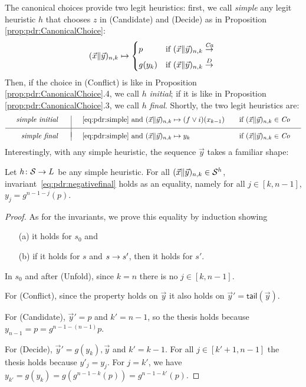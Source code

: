 The canonical choices provide two legit heuristics: first, we call \emph{simple} any legit heuristic $h$ that chooses $z$ in (Candidate) and (Decide) as in Proposition \ref{prop:pdr:CanonicalChoice}:
\begin{equation}\label{eq:pdr:simple}
	( \vec{x} \| \vec{y} )_{n,k} \mapsto
	\begin{cases*}
		p      & if $( \vec{x} \| \vec{y} )_{n,k} \tr{ \mathit{Ca} }$ \\
		g(y_k) & if $( \vec{x} \| \vec{y} )_{n,k} \tr{ D }$
	\end{cases*}
\end{equation}
Then, if the choice in (Conflict) is like in Proposition \ref{prop:pdr:CanonicalChoice}.4, we call $h$ \emph{initial}; if it is like in Proposition \ref{prop:pdr:CanonicalChoice}.3, we call $h$ \emph{final}. Shortly, the two legit heuristics are:
\[
\begin{array}{r|ll}
	\quad\emph{simple initial} \quad\
	                   & \quad\eqref{eq:pdr:simple} \text{ and }( \vec{x} \| \vec{y} )_{n,k} \mapsto
	(f\lor i)(x_{k-1}) & \quad\mbox{if $( \vec{x} \| \vec{y} )_{n,k} \in \mathit{Co}$}\quad
	\\[5pt]
	\hline
	\\[-7pt]
	\quad\emph{simple final} \quad\
	                   & \quad\eqref{eq:pdr:simple} \text{ and }
	( \vec{x} \| \vec{y} )_{n,k} \mapsto
	y_k                & \quad\mbox{if $( \vec{x} \| \vec{y} )_{n,k} \in \mathit{Co}$}\quad          \\
\end{array}
\]
Interestingly, with any simple heuristic, the sequence $\vec{y}$ takes a familiar shape:
\begin{prop}\label{prop:pdr:negativesequencefinalchain}
	Let $h\colon \mathcal{S} \to L$ be any simple heuristic. For all $( \vec{x} \| \vec{y} )_{n,k} \in \mathcal{S}^h$, invariant~\eqref{eq:pdr:negativefinal} holds as an equality, namely for all $j\in[k,n-1]$,
	$y_j=g^{n-1-j}(p)$.
\end{prop}
\begin{proof}
	As for the invariants, we prove this equality by induction showing
	\begin{itemize}
		\item[(a)] it holds for $s_0$ and
		\item[(b)] if it holds for $s$ and $s \stackrel{ }{\to} s'$, then it holds for $s'$.
	\end{itemize}

	In $s_0$ and after (Unfold), since $k = n$ there is no $j \in [k, n-1]$.

	For (Conflict), since the property holds on $\vec{y}$ it also holds on $\vec{y}' = \mathsf{tail}(\vec{y})$.

	For (Candidate), $\vec{y}' = p$ and $k' = n - 1$, so the thesis holds because $y_{n-1} = p = g^{n-1-(n-1)} p$.

	For (Decide), $\vec{y}' = g(y_k), \vec{y}$ and $k' = k - 1$. For all $j \in [k' + 1, n-1]$ the thesis holds because $y'_j = y_j$. For $j = k'$, we have $y_{k'} = g(y_k) = g(g^{n - 1 -k}( p)) = g^{n - 1 - k'}(p)$.
\end{proof}

